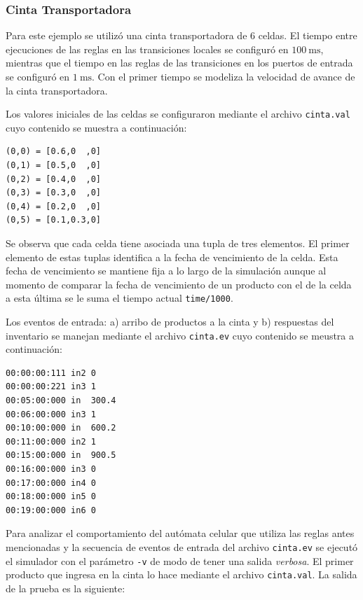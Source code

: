 \documentclass[10pt]{article}
\begin{document}
\subsubsection{Cinta Transportadora}

Para este ejemplo se utilizó una cinta transportadora de $6$ celdas. El tiempo entre ejecuciones de las reglas en las transiciones locales se configuró en $100~\textrm{ms}$, mientras que el tiempo en las reglas de las transiciones en los puertos de entrada se configuró en $1~\textrm{ms}$. Con el primer tiempo se modeliza la velocidad de avance de la cinta transportadora.

Los valores iniciales de las celdas se configuraron mediante el archivo \texttt{cinta.val} cuyo contenido se muestra a continuación:

\begin{minipage}{1\textwidth}
	\centering
	\begin{lstlisting}
(0,0) = [0.6,0  ,0]
(0,1) = [0.5,0  ,0]
(0,2) = [0.4,0  ,0]
(0,3) = [0.3,0  ,0]
(0,4) = [0.2,0  ,0]
(0,5) = [0.1,0.3,0]
	\end{lstlisting}
\end{minipage}

Se observa que cada celda tiene asociada una tupla de tres elementos. El primer elemento de estas tuplas identifica a la fecha de vencimiento de la celda. Esta fecha de vencimiento se mantiene fija a lo largo de la simulación aunque al momento de comparar la fecha de vencimiento de un producto con el de la celda a esta última se le suma el tiempo actual \texttt{time/1000}.

Los eventos de entrada: a) arribo de productos a la cinta y b) respuestas del inventario se manejan mediante el archivo \texttt{cinta.ev} cuyo contenido se meustra a continuación:

\begin{minipage}{1\textwidth}
	\centering
	\begin{lstlisting}
00:00:00:111 in2 0
00:00:00:221 in3 1
00:05:00:000 in  300.4
00:06:00:000 in3 1
00:10:00:000 in  600.2
00:11:00:000 in2 1
00:15:00:000 in  900.5
00:16:00:000 in3 0
00:17:00:000 in4 0
00:18:00:000 in5 0
00:19:00:000 in6 0
	\end{lstlisting}	
\end{minipage}

Para analizar el comportamiento del autómata celular que utiliza las reglas antes mencionadas y la secuencia de eventos de entrada del archivo \texttt{cinta.ev} se ejecutó el simulador con el parámetro \texttt{-v} de modo de tener una salida \textit{verbosa}. El primer producto que ingresa en la cinta lo hace mediante el archivo \texttt{cinta.val}. La salida de la prueba es la siguiente:
\end{document}
